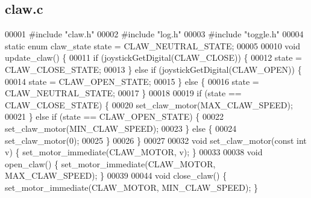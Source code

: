 \subsection{claw.\+c}
\label{a00086_source}

\begin{DoxyCode}
00001 \textcolor{preprocessor}{#include "claw.h"}
00002 \textcolor{preprocessor}{#include "log.h"}
00003 \textcolor{preprocessor}{#include "toggle.h"}
00004 \textcolor{keyword}{static} \textcolor{keyword}{enum} claw_state state = CLAW_NEUTRAL_STATE;
00005 
00010 \textcolor{keywordtype}{void} update_claw() \{
00011   \textcolor{keywordflow}{if} (joystickGetDigital(CLAW_CLOSE)) \{
00012     state = CLAW_CLOSE_STATE;
00013   \} \textcolor{keywordflow}{else} \textcolor{keywordflow}{if} (joystickGetDigital(CLAW_OPEN)) \{
00014     state = CLAW_OPEN_STATE;
00015   \} \textcolor{keywordflow}{else} \{
00016     state = CLAW_NEUTRAL_STATE;
00017   \}
00018 
00019   \textcolor{keywordflow}{if} (state == CLAW_CLOSE_STATE) \{
00020     set_claw_motor(MAX_CLAW_SPEED);
00021   \} \textcolor{keywordflow}{else} \textcolor{keywordflow}{if} (state == CLAW_OPEN_STATE) \{
00022     set_claw_motor(MIN_CLAW_SPEED);
00023   \} \textcolor{keywordflow}{else} \{
00024     set_claw_motor(0);
00025   \}
00026 \}
00027 
00032 \textcolor{keywordtype}{void} set_claw_motor(\textcolor{keyword}{const} \textcolor{keywordtype}{int} v) \{ set_motor_immediate(CLAW_MOTOR, v); \}
00033 
00038 \textcolor{keywordtype}{void} open_claw() \{ set_motor_immediate(CLAW_MOTOR, MAX_CLAW_SPEED); \}
00039 
00044 \textcolor{keywordtype}{void} close_claw() \{ set_motor_immediate(CLAW_MOTOR, MIN_CLAW_SPEED); \}
\end{DoxyCode}
